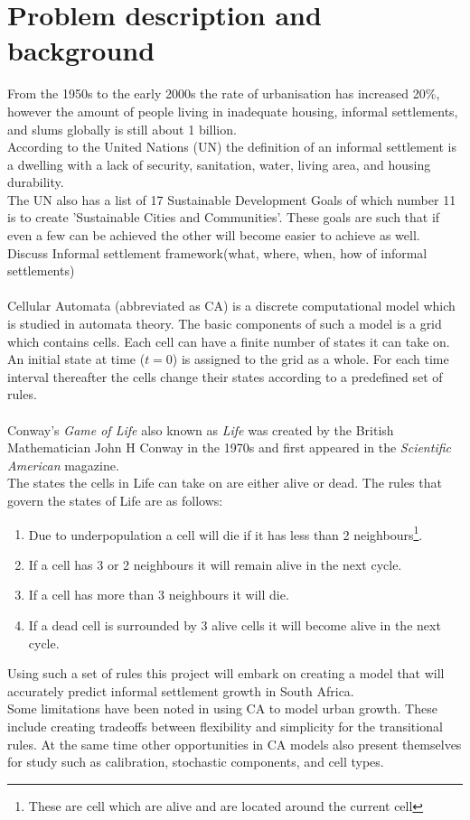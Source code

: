 \section{Problem description and background}
\label{sec:prob}
From the 1950s to the early 2000s the rate of urbanisation has increased 20\%, however the amount of people living in inadequate housing, informal settlements, and slums globally is still about 1 billion.\cite{un}\\
According to the United Nations (UN) the definition of an informal settlement is a dwelling with a lack of security, sanitation, water, living area, and housing durability.\cite{un1} \\
The UN also has a list of 17 Sustainable Development Goals of which number 11 is to create 'Sustainable Cities and Communities'. These goals are such that if even a few can be achieved the other will become easier to achieve as well.
Discuss Informal settlement framework(what, where, when, how of informal settlements)\\\\
Cellular Automata (abbreviated as CA) is a discrete computational model which is studied in automata theory. The basic components of such a model is a grid which contains cells. Each cell can have a finite number of states it can take on. An initial state at time ($t = 0$) is assigned to the grid as a whole. For each time interval thereafter the cells change their states according to a predefined set of rules.\cite{ca}\\\\
Conway's \textit{Game of Life} also known as \textit{Life} was created by the British Mathematician John H Conway in the 1970s and first appeared in the \textit{Scientific American} magazine.\cite{conway}\\
The states the cells in Life can take on are either alive or dead. The rules that govern the states of Life are as follows:
\begin{enumerate}
\item Due to underpopulation a cell will die if it has less than 2 neighbours\footnote{These are cell which are alive and are located around the current cell}.
\item If a cell has 3 or 2 neighbours it will remain alive in the next cycle.
\item If a cell has more than 3 neighbours it will die.
\item If a dead cell is surrounded by 3 alive cells it will become alive in the next cycle.
\end{enumerate}
Using such a set of rules this project will embark on creating a model that will accurately predict informal settlement growth in South Africa.\\
Some limitations have been noted in using CA to model urban growth. These include creating tradeoffs between flexibility and simplicity for the transitional rules. At the same time other opportunities in CA models also present themselves for study such as calibration, stochastic components, and cell types.\cite{ca1}

